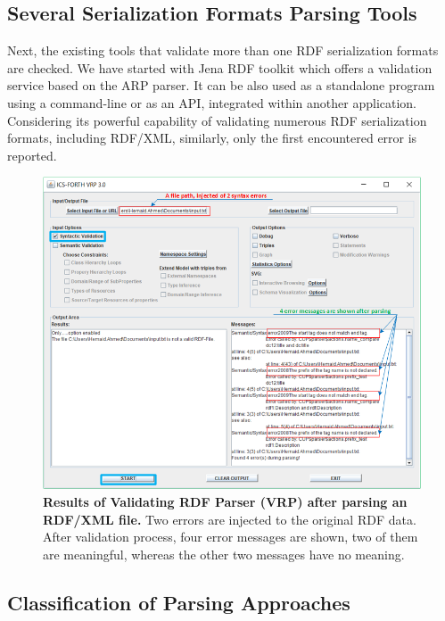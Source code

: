 \subsection{Several Serialization Formats Parsing Tools}

\par Next, the existing tools that validate more than one RDF serialization formats are checked. 
We have started with Jena RDF toolkit \cite{McBride:2002:JSW:613357.613755} which offers a validation service based on the ARP parser. 
It can be also used as a standalone program using a command-line or as an API, integrated within another application.
Considering its powerful capability of validating numerous RDF serialization formats, including RDF/XML, similarly, only the first encountered error is reported.

 \begin{figure}[ht]
		\begin{center}
			\setlength\belowcaptionskip{-10mm}
			\includegraphics[scale=0.7,angle=0]{images/VRPErrorResult.png}
			\caption{\textbf{Results of Validating RDF Parser (VRP) \cite{karsten:Thesis:2000} after parsing an RDF/XML file.} Two errors are injected to the original RDF data. After validation process, four error messages are shown, two of them are meaningful, whereas the other two messages have no meaning.}
			\label{Fig:VRPErrorResult}
		\end{center}
	\end{figure}
	
	
\subsection{Classification of Parsing Approaches}

